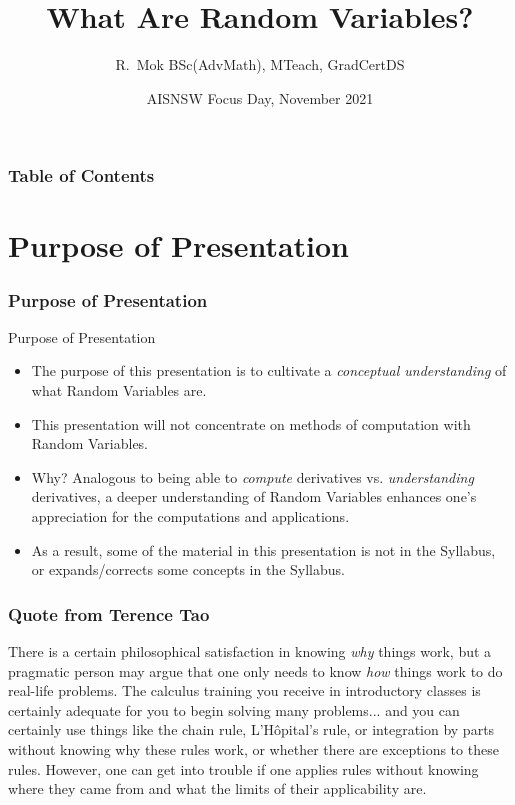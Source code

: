 \documentclass{beamer}
\title[What Are Random Variables?] %
{What Are Random Variables?}
\author[R. Mok] %
{R.~Mok BSc(AdvMath), MTeach, GradCertDS}
\date[November 2021] %
{AISNSW Focus Day, November 2021}
\begin{document}
\frame{\titlepage}


\begin{frame}
\frametitle{Table of Contents}
\tableofcontents
\end{frame}

\section{Purpose of Presentation}


\begin{frame}
\frametitle{Purpose of Presentation}
\begin{block}{Purpose of Presentation}
\begin{itemize}
  \item<2-> The purpose of this presentation is to cultivate a \emph{conceptual understanding} of what Random Variables are.
  \item<3-> This presentation will not concentrate on methods of computation with Random Variables.
  \item<4-> Why? Analogous to being able to \emph{compute} derivatives vs. \emph{understanding} derivatives, a deeper understanding of Random Variables enhances one's appreciation for the computations and applications.
  \item<5-> As a result, some of the material in this presentation is not in the Syllabus, or expands/corrects some concepts in the Syllabus.
\end{itemize}
\end{block}
\end{frame}

\begin{frame}
\frametitle{Quote from Terence Tao}
\begin{block}{}
  There is a certain philosophical satisfaction in knowing \emph{why} things work, but a pragmatic person may argue that one only needs to know \emph{how} things work to do real-life problems. The calculus training you receive in introductory classes is certainly adequate for you to begin solving many problems... and you can certainly use things like the chain rule, L'H\^{o}pital's rule, or integration by parts without knowing why these rules work, or whether there are exceptions to these rules. However, one can get into trouble if one applies rules without knowing where they came from and what the limits of their applicability are.
\end{block}
\end{frame}
\end{document}
